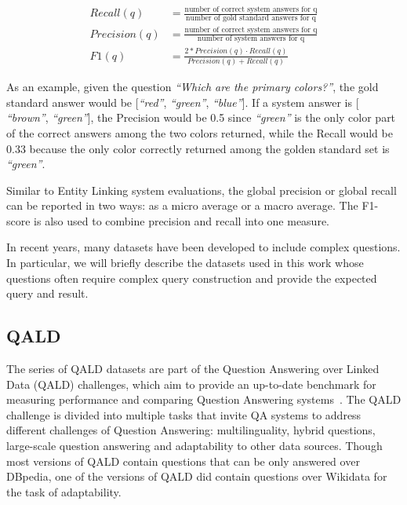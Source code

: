 \begin{equation}
    \begin{aligned}
    Recall(q) &= \frac{\mbox{number of correct system answers for q}}{\mbox{number of gold standard answers for q}} \\
    Precision(q) &= \frac{\mbox{number of correct system answers for q}}{\mbox{number of system answers for q}} \\
    F1(q) &= \frac{2 \ast Precision(q) \cdot Recall(q)}{Precision(q)+Recall(q)}
    \end{aligned}
\end{equation}


As an example, given the question \textit{“Which are the primary colors?”}, the gold standard 
answer would be [\textit{“red”}, \textit{“green”}, \textit{“blue”}]. If a system answer is [
\textit{“brown”}, \textit{“green”}], the Precision would be 0.5 since \textit{“green”} is the 
only color part of the correct answers among the two colors returned, while the Recall would be 
0.33 because the only color correctly returned among the golden standard set is \textit{“green”}.

Similar to Entity Linking system evaluations, the global precision or global recall can be 
reported in two ways: as a micro average or a macro average. The F1-score is also used to 
combine  precision and recall into one measure.

In recent years, many datasets have been developed to include complex questions. In particular, 
we will briefly describe the datasets used in this work whose questions often require complex 
query construction and provide the expected query and result.

\subsection{QALD}
The series of QALD datasets are part of the Question Answering over Linked Data (QALD) challenges, 
which aim to provide an up-to-date benchmark for measuring performance and comparing Question 
Answering systems~\cite{qa:qald-Lopezetal2013}. The QALD challenge is divided into multiple 
tasks that invite QA systems to address different challenges of Question Answering: 
multilinguality, hybrid questions, large-scale question answering and adaptability to other 
data sources. Though most versions of QALD contain questions that can be only answered over 
DBpedia, one of the versions of QALD did contain questions over Wikidata for the task of 
adaptability.

